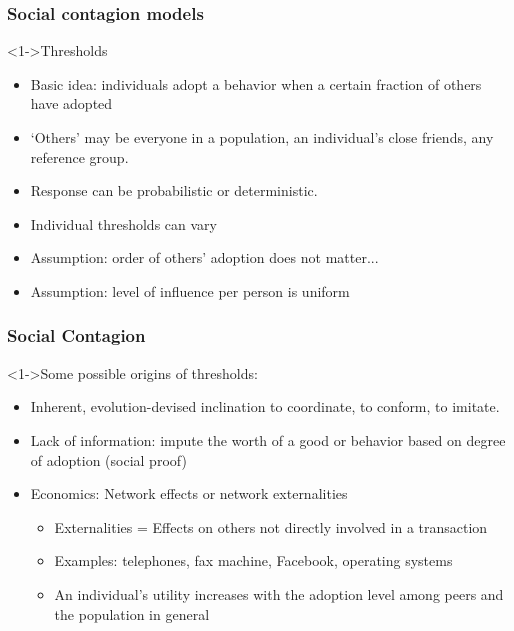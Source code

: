 \begin{frame}
 \frametitle{Social contagion models}

 \begin{block}<1->{Thresholds}
   \begin{itemize}
   \item<2-> Basic idea: individuals adopt a behavior when a
     \alert{certain fraction of others} have adopted
   \item<3-> `Others' may be everyone in a population,
     an individual's close friends, any reference group.
   \item<4-> Response can be probabilistic or deterministic.
   \item<5-> Individual thresholds can vary
   \item<6-> Assumption: order of others' adoption does not matter...
   \item<7-> Assumption: level of influence per person is uniform \\
   \end{itemize}
 \end{block}

\end{frame}

\begin{frame}
  \frametitle{Social Contagion}

  \begin{block}<1->{Some possible origins of thresholds:}
    \begin{itemize}
    \item<2-> Inherent, evolution-devised inclination 
      to coordinate, to conform, to imitate.\cite{bentley2011a}
    \item<3-> \alert{Lack of information}:
        impute the worth of a good or behavior
        based on degree of adoption (social proof)
    \item<4-> Economics: \alert{Network effects} or \alert{network externalities}
      \begin{itemize}
      \item<5-> Externalities = Effects on others not directly involved in a transaction
      \item<6-> Examples: telephones, fax machine, Facebook, operating systems
      \item<7-> An individual's utility increases with
        the adoption level among peers and the population in general
      \end{itemize}
    \end{itemize}
  \end{block}
\end{frame}

